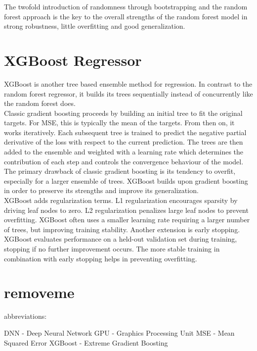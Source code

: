 The twofold introduction of randomness through bootstrapping and the random forest approach is the key to the overall strengths of the random forest model in strong robustness, little overfitting and good generalization.




\section{XGBoost Regressor}

XGBoost is another tree based ensemble method for regression. In contrast to the random forest regressor, it builds its trees sequentially instead of concurrently like the random forest does. \\
Classic gradient boosting proceeds by building an initial tree to fit the original targets. For MSE, this is typically the mean of the targets. From then on, it works iteratively. Each subsequent tree is trained to predict the negative partial derivative of the loss with respect to the current prediction. The trees are then added to the ensemble and weighted with a learning rate which determines the contribution of each step and controls the convergence behaviour of the model. \\
The primary drawback of classic gradient boosting is its tendency to overfit, especially for a larger ensemble of trees. XGBoost builds upon gradient boosting in order to preserve its strengths and improve its generalization. \\
XGBoost adds regularization terms. L1 regularization encourages sparsity by driving leaf nodes to zero. L2 regularization penalizes large leaf nodes to prevent overfitting. XGBoost often uses a smaller learning rate requiring a larger number of trees, but improving training stability. Another extension is early stopping. XGBoost evaluates performance on a held-out validation set during training, stopping if no further improvement occurs. The more stable training in combination with early stopping helps in preventing overfitting.


\section{removeme}

abbreviations:

DNN - Deep Neural Network
GPU - Graphics Processing Unit
MSE - Mean Squared Error
XGBoost - Extreme Gradient Boosting


